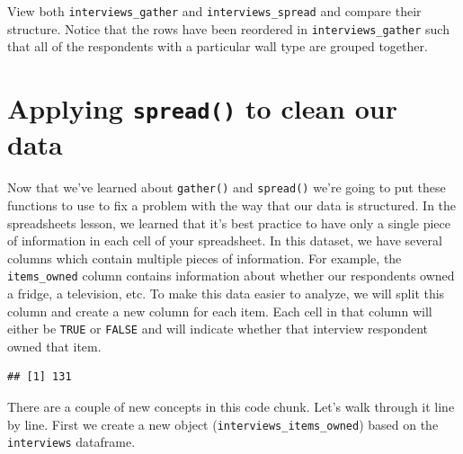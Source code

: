 \documentclass[]{book}
\newenvironment{Shaded}{\begin{snugshade}}{\end{snugshade}}
\newcommand{\KeywordTok}[1]{\textcolor[rgb]{0.13,0.29,0.53}{\textbf{#1}}}
\newcommand{\DataTypeTok}[1]{\textcolor[rgb]{0.13,0.29,0.53}{#1}}
\newcommand{\StringTok}[1]{\textcolor[rgb]{0.31,0.60,0.02}{#1}}
\newcommand{\OtherTok}[1]{\textcolor[rgb]{0.56,0.35,0.01}{#1}}
\newcommand{\OperatorTok}[1]{\textcolor[rgb]{0.81,0.36,0.00}{\textbf{#1}}}
\newcommand{\NormalTok}[1]{#1}
\begin{document}
View both \texttt{interviews\_gather} and \texttt{interviews\_spread}
and compare their structure. Notice that the rows have been reordered in
\texttt{interviews\_gather} such that all of the respondents with a
particular wall type are grouped together.

\section{\texorpdfstring{Applying \texttt{spread()} to clean our
data}{Applying spread() to clean our data}}\label{applying-spread-to-clean-our-data}

Now that we've learned about \texttt{gather()} and \texttt{spread()}
we're going to put these functions to use to fix a problem with the way
that our data is structured. In the spreadsheets lesson, we learned that
it's best practice to have only a single piece of information in each
cell of your spreadsheet. In this dataset, we have several columns which
contain multiple pieces of information. For example, the
\texttt{items\_owned} column contains information about whether our
respondents owned a fridge, a television, etc. To make this data easier
to analyze, we will split this column and create a new column for each
item. Each cell in that column will either be \texttt{TRUE} or
\texttt{FALSE} and will indicate whether that interview respondent owned
that item.

\begin{Shaded}
\end{Shaded}

\begin{verbatim}
## [1] 131
\end{verbatim}

There are a couple of new concepts in this code chunk. Let's walk
through it line by line. First we create a new object
(\texttt{interviews\_items\_owned}) based on the \texttt{interviews}
dataframe.
\end{document}
